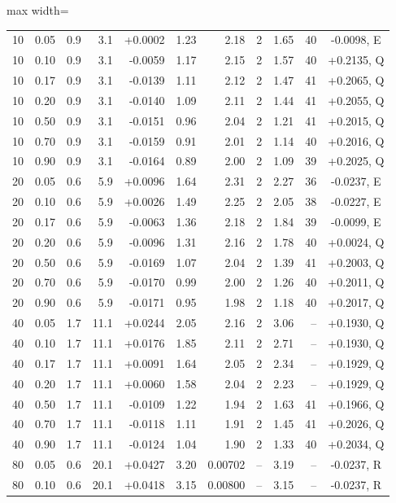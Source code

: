 \documentclass[11pt,letterpaper,fleqn]{article}
\begin{document}
\begin{table}[p]
\begin{adjustbox}{max width=\textwidth}
\begin{tabular}{@{}rrrrrrrrrrc@{}}
10 & 0.05 & 0.9 & 3.1 & +0.0002 & 1.23 & 2.18 & 2 & 1.65 & 40 & -0.0098, E\\
10 & 0.10 & 0.9 & 3.1 & -0.0059 & 1.17 & 2.15 & 2 & 1.57 & 40 & +0.2135, Q\\
10 & 0.17 & 0.9 & 3.1 & -0.0139 & 1.11 & 2.12 & 2 & 1.47 & 41 & +0.2065, Q\\
10 & 0.20 & 0.9 & 3.1 & -0.0140 & 1.09 & 2.11 & 2 & 1.44 & 41 & +0.2055, Q\\
10 & 0.50 & 0.9 & 3.1 & -0.0151 & 0.96 & 2.04 & 2 & 1.21 & 41 & +0.2015, Q\\
10 & 0.70 & 0.9 & 3.1 & -0.0159 & 0.91 & 2.01 & 2 & 1.14 & 40 & +0.2016, Q\\
10 & 0.90 & 0.9 & 3.1 & -0.0164 & 0.89 & 2.00 & 2 & 1.09 & 39 & +0.2025, Q\\
20 & 0.05 & 0.6 & 5.9 & +0.0096 & 1.64 & 2.31 & 2 & 2.27 & 36 & -0.0237, E\\
20 & 0.10 & 0.6 & 5.9 & +0.0026 & 1.49 & 2.25 & 2 & 2.05 & 38 & -0.0227, E\\
20 & 0.17 & 0.6 & 5.9 & -0.0063 & 1.36 & 2.18 & 2 & 1.84 & 39 & -0.0099, E\\
20 & 0.20 & 0.6 & 5.9 & -0.0096 & 1.31 & 2.16 & 2 & 1.78 & 40 & +0.0024, Q\\
20 & 0.50 & 0.6 & 5.9 & -0.0169 & 1.07 & 2.04 & 2 & 1.39 & 41 & +0.2003, Q\\
20 & 0.70 & 0.6 & 5.9 & -0.0170 & 0.99 & 2.00 & 2 & 1.26 & 40 & +0.2011, Q\\
20 & 0.90 & 0.6 & 5.9 & -0.0171 & 0.95 & 1.98 & 2 & 1.18 & 40 & +0.2017, Q\\
40 & 0.05 & 1.7 & 11.1 & +0.0244 & 2.05 & 2.16 & 2 & 3.06 & -- & +0.1930, Q\\
40 & 0.10 & 1.7 & 11.1 & +0.0176 & 1.85 & 2.11 & 2 & 2.71 & -- & +0.1930, Q\\
40 & 0.17 & 1.7 & 11.1 & +0.0091 & 1.64 & 2.05 & 2 & 2.34 & -- & +0.1929, Q\\
40 & 0.20 & 1.7 & 11.1 & +0.0060 & 1.58 & 2.04 & 2 & 2.23 & -- & +0.1929, Q\\
40 & 0.50 & 1.7 & 11.1 & -0.0109 & 1.22 & 1.94 & 2 & 1.63 & 41 & +0.1966, Q\\
40 & 0.70 & 1.7 & 11.1 & -0.0118 & 1.11 & 1.91 & 2 & 1.45 & 41 & +0.2026, Q\\
40 & 0.90 & 1.7 & 11.1 & -0.0124 & 1.04 & 1.90 & 2 & 1.33 & 40 & +0.2034, Q\\
80 & 0.05 & 0.6 & 20.1 & +0.0427 & 3.20 & 0.00702 & -- & 3.19 & -- & -0.0237, R\\
80 & 0.10 & 0.6 & 20.1 & +0.0418 & 3.15 & 0.00800 & -- & 3.15 & -- & -0.0237, R\\

\end{tabular}
\end{adjustbox}
\end{table}
\end{document}
